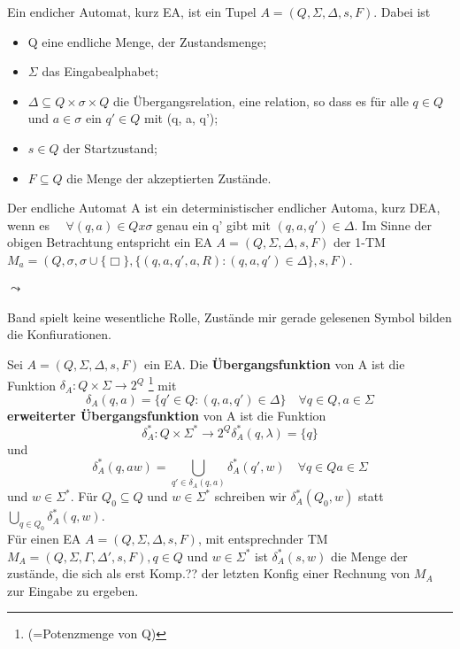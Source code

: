     Ein endicher Automat, kurz EA, ist ein Tupel \(A = (Q, \Sigma, \Delta, s, F)\). Dabei ist 
    \begin{itemize}
        \item Q eine endliche Menge, der Zustandsmenge;
        \item \(\Sigma\) das Eingabealphabet;
        \item \(\Delta \subseteq Q \times \sigma \times Q\) die Übergangsrelation, eine relation, so dass es für alle \(q \in Q\) und \( a\in \sigma\) ein \(q' \in Q\) mit (q, a, q');
        \item \(s \in Q\) der Startzustand;
        \item \(F \subseteq Q\) die Menge der akzeptierten Zustände.
    \end{itemize}
    Der endliche Automat A ist ein deterministischer endlicher Automa,
    kurz DEA, wenn es \(\quad \forall (q,a) \in Q x \sigma\) genau ein q' gibt mit \((q,a,q') \in \Delta\). Im Sinne der obigen Betrachtung entspricht ein EA \(A = (Q, \Sigma, \Delta, s, F)\) der 1-TM \(M_{a} = (Q, \sigma, \sigma \cup \{\Box\}, \{(q, a, q', a, R) : (q, a, q') \in \Delta\}, s, F)\).
        \paragraph*{\(\leadsto\)}
            Band spielt keine wesentliche Rolle, Zustände mir gerade gelesenen Symbol bilden die Konfiurationen.

    Sei \(A = (Q, \Sigma, \Delta, s, F)\) ein EA. Die \textbf{Übergangsfunktion} von A ist die Funktion \(\delta_{A} : Q \times \Sigma \rightarrow 2^{Q}\) \footnote{(=Potenzmenge von Q)} mit 
    \[
        \delta_{A}(q,a) = \{q'\in Q : (q, a, q')\in \Delta\} \quad \forall q \in Q, a \in \Sigma
    \] 
    \textbf{erweiterter Übergangsfunktion} von A ist die Funktion 
    \[
        \delta_{A}^{*} : Q \times \Sigma^{*} \rightarrow 2^{Q} \delta_{A}^{*}(q, \lambda) = \{q\}
    \] 
    und 
    \[
        \delta_{A}^{*}(q, aw) = \bigcup \limits_{q'\in \delta_{A}(q,a)} \delta_{A}^{*}(q', w) \quad \forall q\in Q a\in \Sigma
    \]
    und 
    \(w\in \Sigma^{*}\). Für \(Q_{0} \subseteq Q\) und \(w \in \Sigma^{*}\) schreiben wir \(\delta_{A}^{*} (Q_{0}, w)\) statt \(\bigcup \limits_{q \in Q_{0}} \delta_{A}^{*}(q,w)\).
    \\ Für einen EA \(A = (Q, \Sigma, \Delta, s, F)\), mit entsprechnder TM \(M_{A} = (Q, \Sigma, \Gamma, \Delta', s, F), q \in Q\) und \(w \in \Sigma^{*}\) ist \(\delta_{A}^{*}(s,w)\) die Menge der zustände, die sich als erst Komp.?? der letzten Konfig einer Rechnung von \(M_{A}\) zur Eingabe zu ergeben.

